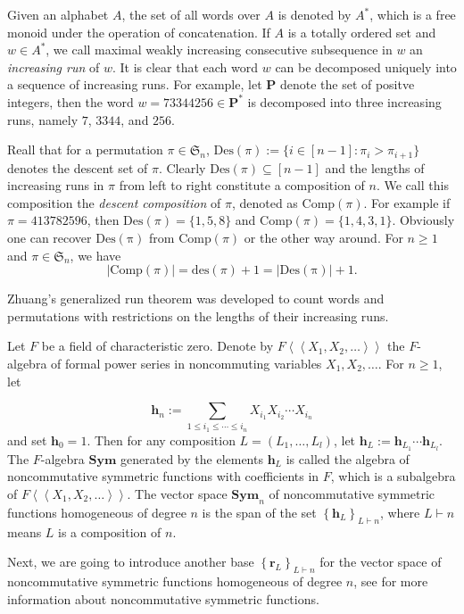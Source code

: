 \documentclass[11pt,reqno]{amsart}
\numberwithin{equation}{section}
\theoremstyle{plain}
\theoremstyle{definition}
\renewcommand{\S}{\mathfrak{S}}
\begin{document}
Given an alphabet $A$, the set of all words over $A$ is denoted by $A^*$, which is a free monoid under the operation of concatenation. If $A$ is a totally ordered set and $w \in A^*$, we call maximal weakly increasing consecutive subsequence in $w$ an \emph{increasing run} of $w$. It is clear that each word $w$ can be decomposed uniquely into a sequence of increasing runs. For example, let $\mathbf{P}$ denote the set of positve integers, then the word $w=73344256 \in \mathbf{P}^*$ is decomposed into three increasing runs, namely $7$, $3344$, and $256$.

Reall that for a permutation $\pi \in \S_n$, $\mathrm{Des}(\pi):=\{i \in [n-1]:\pi_i>\pi_{i+1}\}$ denotes the descent set of $\pi$. Clearly $\mathrm{Des}(\pi) \subseteq [n-1]$ and the lengths of increasing runs in $\pi$ from left to right constitute a composition of $n$. We call this composition the \emph{descent composition} of $\pi$, denoted as $\mathrm{Comp}(\pi)$. For example if $\pi=413782596$, then $\mathrm{Des}(\pi)=\{1,5,8\}$ and $\mathrm{Comp}(\pi)=\{1,4,3,1\}$. Obviously one can recover $\mathrm{Des(\pi)}$ from $\mathrm{Comp}(\pi)$ or the other way around. For $n\geq 1$ and $\pi \in \S_n$, we have $$|\mathrm{Comp}(\pi)|=\mathrm{des}(\pi)+1=|\mathrm{Des(\pi)}|+1.$$

Zhuang's generalized run theorem was developed to count words and permutations with restrictions on the lengths of their increasing runs.

Let $F$ be a field of characteristic zero. Denote by $F\left\langle\left\langle X_1, X_2, \ldots\right\rangle\right\rangle$ the $F$-algebra of formal power series in noncommuting variables $X_1, X_2, \ldots$. For $n \geq 1$, let

$$
\mathbf{h}_n:=\sum_{1 \leq i_1 \leq \cdots \leq i_n} X_{i_1} X_{i_2} \cdots X_{i_n}
$$and set $\mathbf{h}_0=1$. Then for any composition $L=\left(L_1, \ldots, L_l\right)$, let $\mathbf{h}_L:=\mathbf{h}_{L_1} \cdots \mathbf{h}_{L_l}$. The $F$-algebra $\mathbf{S y m}$ generated by the elements $\mathbf{h}_L$ is called the algebra of noncommutative symmetric functions with coefficients in $F$, which is a subalgebra of $F\left\langle\left\langle X_1, X_2, \ldots\right\rangle\right\rangle$. The vector space $\mathbf{S y m}_n$ of noncommutative symmetric functions homogeneous of degree $n$ is the span of the set $\left\{\mathbf{h}_L\right\}_{L \vdash n}$, where $L\vdash n$ means $L$ is a composition of $n$.

Next, we are going to introduce another base $\left\{\mathbf{r}_L\right\}_{L \vdash n}$ for the vector space of noncommutative symmetric functions homogeneous of degree $n$, see \cite{GKLLRT95} for more information about noncommutative symmetric functions. 
\end{document}
